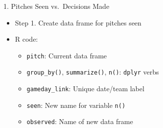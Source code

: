 \begin{frame}[fragile]{1. Pitches Seen vs.~Decisions Made}

\begin{itemize}

\item
  Step 1. Create data frame for pitches seen
\item
  R code:

  \begin{itemize}
  
  \item
    \texttt{pitch}: Current data frame
  \item
    \texttt{group\_by()}, \texttt{summarize()}, \texttt{n()}:
    \texttt{dplyr} verbs
  \item
    \texttt{gameday\_link}: Unique date/team label
  \item
    \texttt{seen}: New name for variable \texttt{n()}
  \item
    \texttt{observed}: Name of new data frame
  \end{itemize}
\end{itemize}

\footnotesize

\begin{Shaded}
\end{Shaded}

\end{frame}

